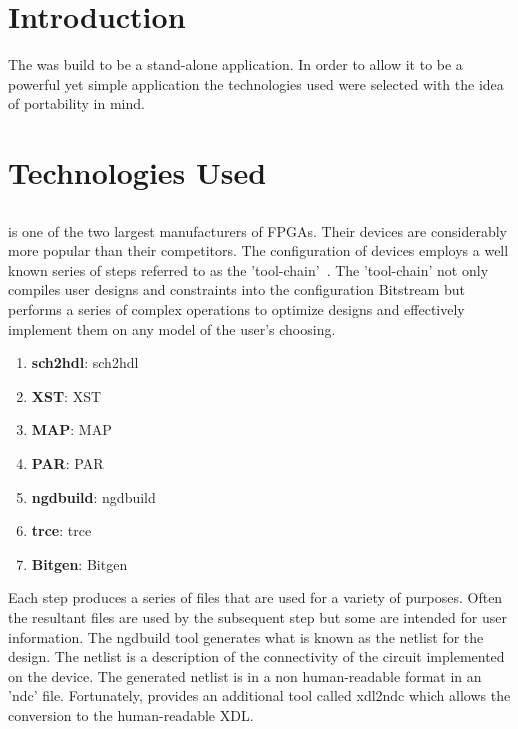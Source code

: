 \label{chapter:implementation}
\section{Introduction}
The \NameNoPeriod was build to be a stand-alone application.
In order to allow it to be a powerful yet simple application the technologies used were selected with the idea of portability in mind.

\section{Technologies Used}
\subsection{\Xilinx}
\Xilinx is one of the two largest manufacturers of \acrshort{FPGA}s. 
Their devices are considerably more popular than their competitors.
The configuration of devices employs a well known series of steps referred to as the \Xilinx 'tool-chain'~\cite{xilnxDevManual}.
The 'tool-chain' not only compiles user designs and constraints into the configuration \gls{Bitstream} but performs a series of complex operations to optimize designs and effectively implement them on any \Xilinx model of the user's choosing.
\begin{enumerate}
	\item \textbf{\gls{sch2hdl}}: \glsdesc{sch2hdl}
	\item \textbf{\gls{XST}}: \glsdesc{XST}
	\item \textbf{\gls{MAP}}: \glsdesc{MAP}
	\item \textbf{\gls{PAR}}: \glsdesc{PAR}
	\item \textbf{\gls{ngdbuild}}: \glsdesc{ngdbuild}
	\item \textbf{\gls{trce}}: \glsdesc{trce}
	\item \textbf{\gls{Bitgen}}: \glsdesc{Bitgen}
\end{enumerate}
Each step produces a series of files that are used for a variety of purposes. 
Often the resultant files are used by the subsequent step but some are intended for user information.
The \gls{ngdbuild} tool generates what is known as the netlist for the design.
The netlist is a description of the connectivity of the circuit implemented on the device. 
The generated netlist is in a non human-readable format in an 'ndc' file.
Fortunately, \Xilinx provides an additional tool called \acrshort{xdl2ndc} which allows the conversion to the human-readable \acrfull{XDL}.
